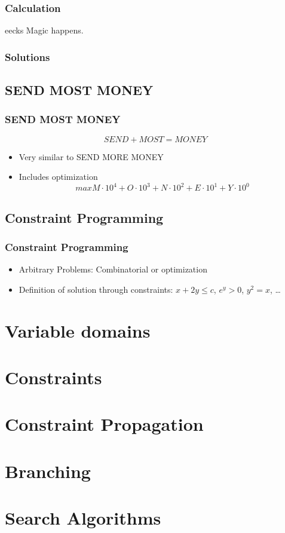 \documentclass[hyperref={pdfpagelabels=false}]{beamer}
\begin{document}
\begin{frame}
	\frametitle{Calculation}
	
	\begin{beamercolorbox}[shadow=true, rounded=true]{eecks}
		\centering		
		\Large{Magic happens.}
	\end{beamercolorbox}
\end{frame}

\begin{frame}
	\frametitle{Solutions}
\end{frame}

\subsection{SEND MOST MONEY}
\begin{frame}
	\frametitle{SEND MOST MONEY}
	\[SEND + MOST = MONEY\]
	\begin{itemize}
		\item Very similar to SEND MORE MONEY
		\item Includes optimization
			\[max M \cdot 10^4 + O \cdot 10^3 + N \cdot 10^2 + E \cdot 10^1 + Y \cdot 10^0\]
	\end{itemize}
\end{frame}

\subsection{Constraint Programming}
\begin{frame}
	\frametitle{Constraint Programming}
	\begin{itemize}
		\item Arbitrary Problems: Combinatorial or optimization
		\item Definition of solution through constraints: $x + 2y \le c$, $e^y > 0$, $y^2 = x$, \dots
	\end{itemize}
\end{frame}

\section{Variable domains}
\begin{frame}
\end{frame}

\section{Constraints}
\begin{frame}
\end{frame}

\section{Constraint Propagation}
\begin{frame}
\end{frame}

\section{Branching}
\begin{frame}
\end{frame}

\section{Search Algorithms}
\begin{frame}
\end{frame}
\end{document}

